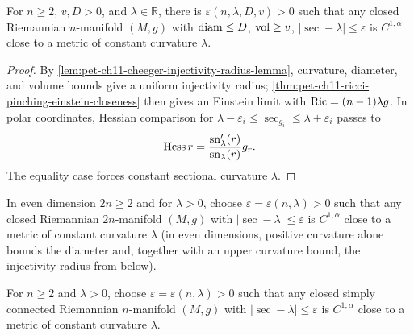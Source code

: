 \begin{theorem}
  \label{thm:pet-ch11-sec-pinching-constant-curvature-closeness}
  For $n\ge2$, $v,D>0$, and $\lambda\in\mathbb{R}$, there is
  $\varepsilon(n,\lambda,D,v)>0$ such that any closed Riemannian $n$-manifold
  $(M,g)$ with $\operatorname{diam}\le D$, $\operatorname{vol}\ge v$, $|\sec-\lambda|\le\varepsilon$ is
  $C^{1,\alpha}$ close to a metric of constant curvature $\lambda$.
\end{theorem}
\begin{proof}
  \sketch
  By \cref{lem:pet-ch11-cheeger-injectivity-radius-lemma}, curvature, diameter, and volume bounds give a uniform injectivity radius; \cref{thm:pet-ch11-ricci-pinching-einstein-closeness} then gives an Einstein limit with \(\operatorname{Ric}=(n-1)\lambda g\). In polar coordinates, Hessian comparison for \(\lambda-\varepsilon_i\le\sec_{g_i}\le\lambda+\varepsilon_i\) passes to
  \[
    \operatorname{Hess} r=\frac{\mathrm{sn}_{\lambda}^{\prime}(r)}{\mathrm{sn}_{\lambda}(r)}g_r.
  \]
  The equality case forces constant sectional curvature \(\lambda\).
\end{proof}


\begin{corollary}
  \label{cor:pet-ch11-even-dim-positive-pinching}
  In even dimension $2n\ge2$ and for $\lambda>0$, choose
  $\varepsilon=\varepsilon(n,\lambda)>0$
  such that any closed Riemannian $2n$-manifold $(M,g)$ with
  $|\sec-\lambda|\le\varepsilon$ is $C^{1,\alpha}$ close to a metric of
  constant curvature $\lambda$ (in even dimensions, positive curvature alone
  bounds the diameter and, together with an upper curvature bound, the
  injectivity radius from below).
\end{corollary}

\begin{corollary}
  \label{cor:pet-ch11-odd-dim-simply-connected-pinching}
  For $n\ge2$ and $\lambda>0$, choose $\varepsilon=\varepsilon(n,\lambda)>0$
  such that any closed simply connected Riemannian $n$-manifold $(M,g)$ with
  $|\sec-\lambda|\le\varepsilon$ is $C^{1,\alpha}$ close to a metric of
  constant curvature $\lambda$.
\end{corollary}

